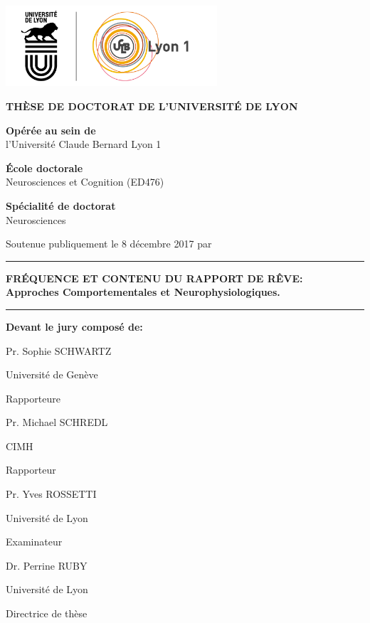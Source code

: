 \begin{titlepage}

  \setlength{\parindent}{0pt}
  \thispagestyle{empty}

  \begin{center}
  \includegraphics[height=3cm]{content/logo}
  \end{center}

  \bigskip

  \begin{center}
  \fontsize{14pt}{16pt}\selectfont
  \textbf{THÈSE DE DOCTORAT DE L'UNIVERSITÉ DE LYON}\\

  \bigskip

  \fontsize{12pt}{14pt}\selectfont
  \textbf{Opérée au sein de}\\ \medskip
  l'Université Claude Bernard Lyon 1

  \textbf{École doctorale}\\ \medskip
  Neurosciences et Cognition (ED476)

  \textbf{Spécialité de doctorat}\\ \medskip
  Neurosciences

  Soutenue publiquement le 8 décembre 2017 par\\ \medskip
  \fontsize{14pt}{16pt}\selectfont
  \textbf{\thesisName}

  \rule{\textwidth}{0.5pt}

  \fontsize{16pt}{20pt}\selectfont
  \textbf{FRÉQUENCE ET CONTENU DU RAPPORT DE RÊVE:\\ \medskip
  Approches Comportementales et Neurophysiologiques.}
  \rule{\textwidth}{0.5pt}

  \end{center}

  \fontsize{12pt}{14pt}\selectfont
  \textbf{Devant le jury composé de:}

  \newcommand\textline[4][t]{%
      \par\noindent\parbox[#1]{.333\textwidth}{\raggedright#2}%
      \parbox[#1]{.333\textwidth}{\centering#3}%
      \parbox[#1]{.333\textwidth}{\raggedleft#4}\par
  }

  \textline[t]{Pr. Sophie SCHWARTZ}{Université de Genève}{Rapporteure}
  \textline[t]{Pr. Michael SCHREDL}{CIMH}{Rapporteur}
  \textline[t]{Pr. Yves ROSSETTI}{Université de Lyon}{Examinateur}
  \textline[t]{Dr. Perrine RUBY }{Université de Lyon}{Directrice de thèse}

\end{titlepage}

\cleardoublepage

